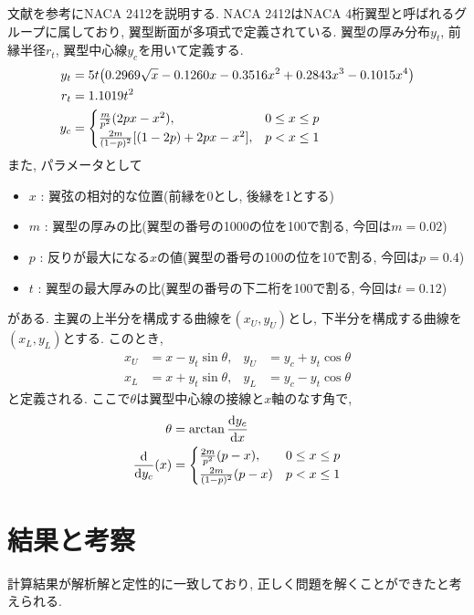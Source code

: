 \documentclass{ltjsarticle}
\begin{document}
文献\cite{Rinoie2011}を参考にNACA 2412を説明する.
NACA 2412はNACA 4桁翼型と呼ばれるグループに属しており, 翼型断面が多項式で定義されている.
翼型の厚み分布$y_t$, 前縁半径$r_t$, 翼型中心線$y_c$を用いて定義する.
\begin{align}
    y_t &= 5t \qty(0.2969 \sqrt{x} - 0.1260 x - 0.3516 x^2 + 0.2843 x^3 - 0.1015 x^4) \\
    r_t &= 1.1019t^2 \\
    y_c &=
    \begin{cases}
        \frac{m}{p^2}(2px-x^2),& 0\leq x\leq p\\
        \frac{2m}{(1-p)^2}[(1-2p)+2px-x^2],& p< x\leq 1
    \end{cases}
\end{align}
また, パラメータとして
\begin{itemize}
    \item $x$ : 翼弦の相対的な位置(前縁を0とし, 後縁を1とする)
    \item $m$ : 翼型の厚みの比(翼型の番号の1000の位を100で割る, 今回は$m=0.02$)
    \item $p$ : 反りが最大になる$x$の値(翼型の番号の100の位を10で割る, 今回は$p=0.4$)
    \item $t$ : 翼型の最大厚みの比(翼型の番号の下二桁を100で割る, 今回は$t=0.12$)
\end{itemize}
がある.
主翼の上半分を構成する曲線を$(x_U,y_U)$とし, 下半分を構成する曲線を$(x_L,y_L)$とする.
このとき,
\begin{align}
    x_U &= x-y_t\sin{\theta},&y_U &= y_c+y_t\cos{\theta}\\
    x_L &= x+y_t\sin{\theta},&y_L &= y_c-y_t\cos{\theta}
\end{align}
と定義される\cite{Abbott1945}.
ここで$\theta$は翼型中心線の接線と$x$軸のなす角で,
\begin{align}
    \theta &= \arctan{\dv{y_c}{x}} \\
    \dv{y_c}(x) &= 
    \begin{cases}
        \frac{2m}{p^2}(p-x), & 0\leq x\leq p \\
        \frac{2m}{(1-p)^2}(p-x) & p <x\leq 1
    \end{cases}
\end{align}

\section{結果と考察}
計算結果が解析解と定性的に一致しており, 正しく問題を解くことができたと考えられる.
\end{document}
